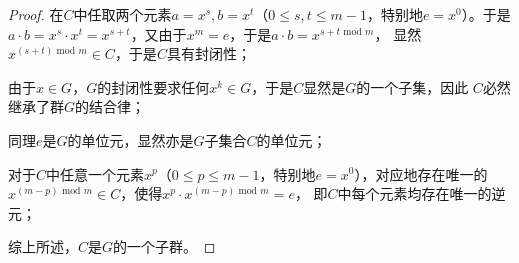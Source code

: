\begin{proof}
    在$C$中任取两个元素$a=x^s,b=x^t$（$0\le s,t\le m-1$，特别地$e=x^0$）。于是
    $a\cdot b=x^s\cdot x^t=x^{s+t}$，又由于$x^m=e$，于是$a\cdot b=x^{s+t\text{ mod }m}$，
    显然$x^{(s+t)\text{ mod }m}\in C$，于是$C$具有封闭性；

    由于$x\in G$，$G$的封闭性要求任何$x^k\in G$，于是$C$显然是$G$的一个子集，因此
    $C$必然继承了群$G$的结合律；

    同理$e$是$G$的单位元，显然亦是$G$子集合$C$的单位元；

    对于$C$中任意一个元素$x^p$（$0\le p\le m-1$，特别地$e=x^0$），对应地存在唯一的
    $x^{(m-p)\text{ mod }m}\in C$，使得$x^p\cdot x^{(m-p)\text{ mod }m} = e$，
    即$C$中每个元素均存在唯一的逆元；

    综上所述，$C$是$G$的一个子群。
\end{proof}